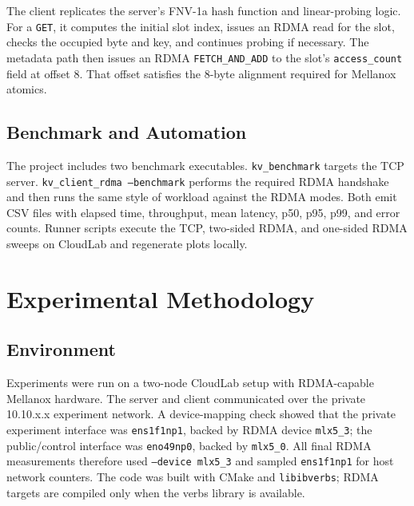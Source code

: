 \documentclass[letterpaper,twocolumn,10pt]{article}
\begin{document}
The client replicates the server's FNV-1a hash function and linear-probing
logic.  For a \texttt{GET}, it computes the initial slot index, issues an RDMA
read for the slot, checks the occupied byte and key, and continues probing if
necessary.  The metadata path then issues an RDMA \texttt{FETCH\_AND\_ADD} to
the slot's \texttt{access\_count} field at offset 8.  That offset satisfies
the 8-byte alignment required for Mellanox atomics.

\subsection{Benchmark and Automation}

The project includes two benchmark executables.  \texttt{kv\_benchmark}
targets the TCP server.  \texttt{kv\_client\_rdma --benchmark} performs the
required RDMA handshake and then runs the same style of workload against the
RDMA modes.  Both emit CSV files with elapsed time, throughput, mean latency,
p50, p95, p99, and error counts.  Runner scripts execute the TCP, two-sided
RDMA, and one-sided RDMA sweeps on CloudLab and regenerate plots locally.

\section{Experimental Methodology}

\subsection{Environment}

Experiments were run on a two-node CloudLab setup with RDMA-capable Mellanox
hardware.  The server and client communicated over the private 10.10.x.x
experiment network.  A device-mapping check showed that the private experiment
interface was \texttt{ens1f1np1}, backed by RDMA device \texttt{mlx5\_3}; the
public/control interface was \texttt{eno49np0}, backed by \texttt{mlx5\_0}.
All final RDMA measurements therefore used \texttt{--device mlx5\_3} and
sampled \texttt{ens1f1np1} for host network counters.  The code was built with
CMake and \texttt{libibverbs}; RDMA targets are compiled only when the verbs
library is available.
\end{document}

